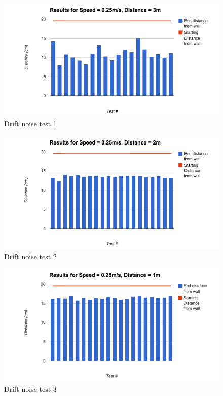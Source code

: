\documentclass{article}
\begin{document}
\begin{multicols}{2}
	\begin{figure}[H]
	\centering
	\includegraphics[width=\linewidth]{ExperimentalResults4}
	\caption{Drift noise test 1}
	\end{figure}
	\begin{figure}[H]
	\centering
	\includegraphics[width=\linewidth]{ExperimentalResults5}
	\caption{Drift noise test 2}
	\end{figure}
	\begin{figure}[H]
	\centering
	\includegraphics[width=\linewidth]{ExperimentalResults6}
	\caption{Drift noise test 3}
	\end{figure}
	

\end{multicols}
\end{document}
